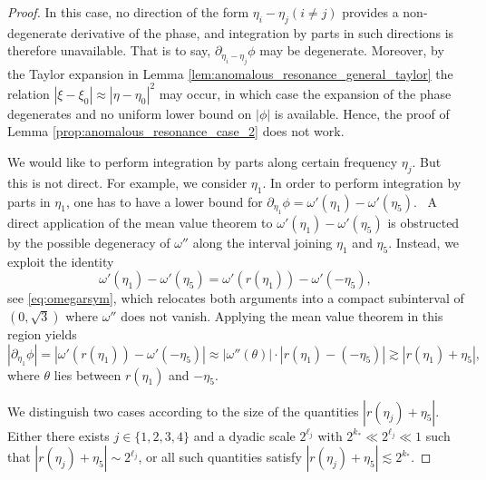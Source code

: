 \documentclass[reqno,english,11pt]{amsart}
\theoremstyle{definition}
\numberwithin{equation}{section}
\begin{document}
\begin{proof}
    In this case, no direction of the form $\eta_i-\eta_j (i\neq j)$ provides a non-degenerate derivative of the phase, and integration by parts in such directions is therefore unavailable. That is to say, $\partial_{\eta_i-\eta_j}\phi$ may be degenerate. Moreover, by the Taylor expansion in Lemma \ref{lem:anomalous_resonance_general_taylor} the relation $|\xi-\xi_0|\approx|\eta-\eta_0|^2$ may occur, in which case the expansion of the phase degenerates and no uniform lower bound on $|\phi|$ is available. Hence, the proof of Lemma \ref{prop:anomalous_resonance_case_2} does not work. 
    

    We would like to perform integration by parts along certain frequency $\eta_j$.  But this is not direct.  For example,  we consider $\eta_1$. In order to perform integration by parts in $\eta_1$, one has to have a lower bound for $ \partial_{\eta_1}\phi=\omega'(\eta_1)-\omega'(\eta_5)$. \ A direct application of the mean value theorem to $\omega'(\eta_1)-\omega'(\eta_5)$ is obstructed by the possible degeneracy of $\omega''$ along the interval joining $\eta_1$ and $\eta_5$. Instead, we exploit the identity
$$\omega'(\eta_1)-\omega'(\eta_5)=\omega'(r(\eta_1))-\omega'(-\eta_5),$$ see \eqref{eq:omegarsym},
which relocates both arguments into a compact subinterval of $(0,\sqrt{3})$ where $\omega''$ does not vanish.
Applying the mean value theorem in this region yields
\begin{equation}\label{eq:eta1diff}
    |\partial_{\eta_1}\phi| = |\omega'(r(\eta_1)) - \omega'(-\eta_5)| \approx |\omega''(\theta)| \cdot |r(\eta_1) - (-\eta_5)| \gtrsim |r(\eta_1) + \eta_5|,
\end{equation}
where $\theta$ lies between $r(\eta_1)$ and $-\eta_5$.

We distinguish two cases according to the size of the quantities $|r(\eta_j)+\eta_5|$. Either there exists $j\in\{1,2,3,4\}$ and a dyadic scale $2^{\ell_j}$ with $2^{k_*}\ll 2^{\ell_j}\ll 1$ such that $|r(\eta_j)+\eta_5|\sim 2^{\ell_j}$, or all such quantities satisfy $|r(\eta_j)+\eta_5|\lesssim 2^{k_*}$.


\end{proof}
\end{document}
